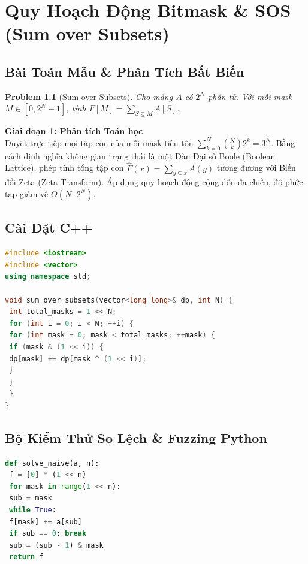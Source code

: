 \documentclass[11pt, letterpaper]{report}
\newtheorem{baitoan}{Problem}[chapter]
\begin{document}
\chapter{Quy Hoạch Động Bitmask \& SOS (Sum over Subsets)}
\label{mod:bitmask_sos}

\section{Bài Toán Mẫu \& Phân Tích Bất Biến}
\begin{baitoan}[Sum over Subsets]
Cho mảng $A$ có $2^N$ phần tử. Với mỗi mask $M \in [0, 2^N - 1]$, tính $F[M] = \sum_{S \subseteq M} A[S]$.
\end{baitoan}

\noindent\textbf{Giai đoạn 1: Phân tích Toán học}\\
Duyệt trực tiếp mọi tập con của mỗi mask tiêu tốn $\sum_{k=0}^N \binom{N}{k} 2^k = 3^N$. Bằng cách định nghĩa không gian trạng thái là một Dàn Đại số Boole (Boolean Lattice), phép tính tổng tập con $\hat{F}(x) = \sum_{y \subseteq x} A(y)$ tương đương với Biến đổi Zeta (Zeta Transform). Áp dụng quy hoạch động cộng dồn đa chiều, độ phức tạp giảm về $\Theta(N \cdot 2^N)$.

\section{Cài Đặt C++}
\begin{lstlisting}[language=C++, caption={C++ SOS DP In-Place Engine}]
#include <iostream>
#include <vector>
using namespace std;

void sum_over_subsets(vector<long long>& dp, int N) {
 int total_masks = 1 << N;
 for (int i = 0; i < N; ++i) {
 for (int mask = 0; mask < total_masks; ++mask) {
 if (mask & (1 << i)) {
 dp[mask] += dp[mask ^ (1 << i)];
 }
 }
 }
}
\end{lstlisting}

\section{Bộ Kiểm Thử So Lệch \& Fuzzing Python}
\begin{lstlisting}[language=Python, caption={Python $3^N$ naive vs N $2^N$ SOS DP Oracle}]
def solve_naive(a, n):
 f = [0] * (1 << n)
 for mask in range(1 << n):
 sub = mask
 while True:
 f[mask] += a[sub]
 if sub == 0: break
 sub = (sub - 1) & mask
 return f
\end{lstlisting}
\end{document}
